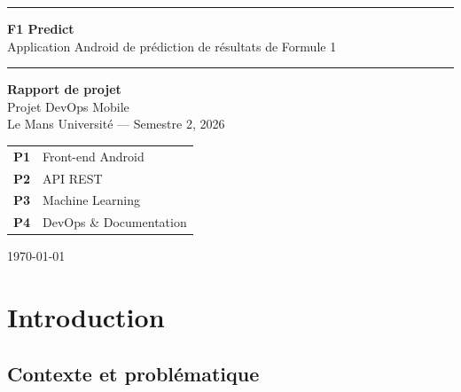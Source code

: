 \documentclass[12pt, a4paper]{article}
\begin{document}
\begin{titlepage}
    \centering
    \vspace*{2cm}

    {\color{f1red}\rule{\linewidth}{1.5pt}}
    \vspace{0.5cm}

    {\Huge \textbf{F1 Predict}}\\[0.4cm]
    {\Large Application Android de prédiction de résultats de Formule 1}

    \vspace{0.5cm}
    {\color{f1red}\rule{\linewidth}{1.5pt}}

    \vspace{2cm}

    {\large \textbf{Rapport de projet}}\\[0.3cm]
    {\large Projet DevOps Mobile}\\[0.3cm]
    {\large Le Mans Université — Semestre 2, 2026}

    \vspace{2.5cm}

    \begin{tabular}{ll}
        \textbf{P1} & Front-end Android \\[0.2cm]
        \textbf{P2} & API REST \\[0.2cm]
        \textbf{P3} & Machine Learning \\[0.2cm]
        \textbf{P4} & DevOps \& Documentation \\
    \end{tabular}

    \vfill

    {\large \today}
\end{titlepage}

\newpage
\tableofcontents
\newpage

\section{Introduction}

\subsection{Contexte et problématique}
\end{document}
